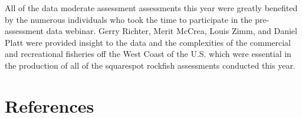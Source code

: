 \documentclass[11pt,
  english,
  a4paper,
]{article}
\begin{document}
\leavevmode\tagmcend\tagstructend\par


All of the data moderate assessment assessments this year were greatly benefited by the numerous individuals who took the time to participate in the pre-assessment data webinar. Gerry Richter, Merit McCrea, Louis Zimm, and Daniel Platt were provided insight to the data and the complexities of the commercial and recreational fisheries off the West Coast of the U.S. which were essential in the production of all of the squarespot rockfish assessments conducted this year.

\leavevmode\tagmcend\tagstructend\par

\newpage

\clearpage


\hypertarget{references}{%
\section{References}\label{references}}

\leavevmode\tagmcend\tagstructend

\end{document}
